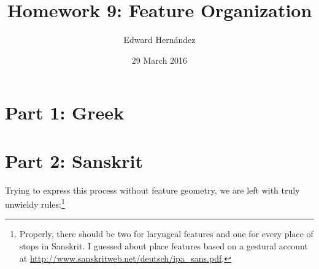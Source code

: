 \documentclass[doc,12pt]{apa6}
\begin{document}
\title{Homework 9: Feature Organization}
\author{Edward Hern\'{a}ndez}
\date{29 March 2016}
\maketitle

\section{Part 1: Greek}

\section{Part 2: Sanskrit}


Trying to express this process without feature geometry, we are left with truly
unwieldy rules:\footnote{Properly, there should be two for laryngeal features
	and one for every place of stops in Sanskrit. I guessed about place
	features based on a gestural account at
	\url{http://www.sanskritweb.net/deutsch/ipa_sans.pdf}.}

\begin{exe}
	\ex {}
	\ex {}
				      
\end{exe}
\end{document}
